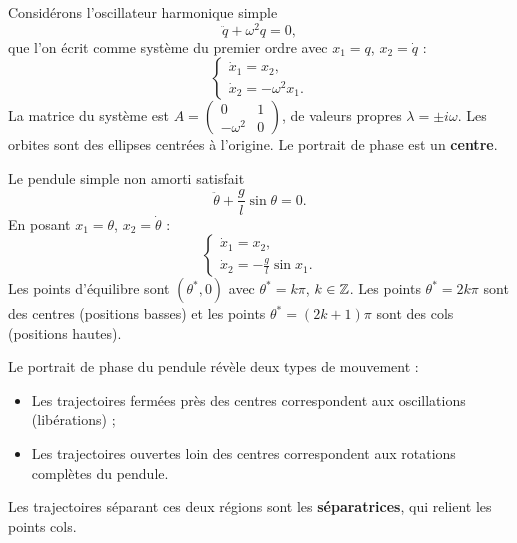 \begin{exemple}
Consid\'erons l'oscillateur harmonique simple
\[
    \ddot{q} + \omega^2 q = 0,
\]
que l'on \'ecrit comme syst\`eme du premier ordre avec $x_1 = q$, $x_2 = \dot{q}$ :
\[
    \begin{cases}
        \dot{x}_1 = x_2, \\
        \dot{x}_2 = -\omega^2 x_1.
    \end{cases}
\]
La matrice du syst\`eme est $A = \begin{pmatrix} 0 & 1 \\ -\omega^2 & 0 \end{pmatrix}$,
de valeurs propres $\lambda = \pm i\omega$. Les orbites sont des ellipses
centr\'ees \`a l'origine. Le portrait de phase est un \textbf{centre}.
\end{exemple}

\begin{exemple}
\label{ex:pendule}
Le pendule simple non amorti satisfait
\[
    \ddot{\theta} + \frac{g}{l}\sin\theta = 0.
\]
En posant $x_1 = \theta$, $x_2 = \dot{\theta}$ :
\[
    \begin{cases}
        \dot{x}_1 = x_2, \\
        \dot{x}_2 = -\frac{g}{l}\sin x_1.
    \end{cases}
\]
Les points d'\'equilibre sont $(\theta^*, 0)$ avec $\theta^* = k\pi$, $k \in \mathbb{Z}$.
Les points $\theta^* = 2k\pi$ sont des centres (positions basses) et les points
$\theta^* = (2k+1)\pi$ sont des cols (positions hautes).
\end{exemple}

\begin{intuition}
Le portrait de phase du pendule r\'ev\`ele deux types de mouvement :
\begin{itemize}
    \item Les trajectoires ferm\'ees pr\`es des centres correspondent aux
    oscillations (lib\'erations) ;
    \item Les trajectoires ouvertes loin des centres correspondent aux
    rotations compl\`etes du pendule.
\end{itemize}
Les trajectoires s\'eparant ces deux r\'egions sont les \textbf{s\'eparatrices},
qui relient les points cols.
\end{intuition}

